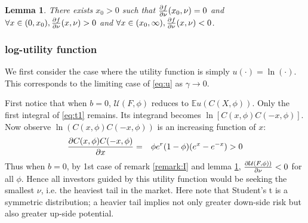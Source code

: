 \documentclass[11pt,a4]{amsart}
\newcommand{\pd}{\partial}
\newtheorem{lemma}{Lemma}[section]
\newcommand{\E }{{\mathbb E}}
\newcommand{\1}{{\mathbf 1}}
\begin{document}
\begin{lemma}
  \label{lemma:II}
  There exists $x_0 > 0$ such that ${\pd f \over \pd \nu}(x_0, \nu) = 0$ and
  $\forall x \in (0, x_0), {\pd f \over \pd \nu}(x, \nu) > 0$ and
  $\forall x \in (x_0, \infty), {\pd f \over \pd \nu}(x, \nu) < 0$.
\end{lemma}

\subsubsection{log-utility function}
We first consider the case where the utility function is simply
$u(\cdot) = \ln(\cdot)$. This corresponds to the limiting case of
\eqref{eq:u} as $\gamma \to 0$.

First notice that when $b = 0$, $\mathcal U(F, \phi)$ reduces to
$\E u(C(X, \phi))$. Only the first integral of \eqref{eq:t1} remains.
Its integrand becomes $\ln[C(x, \phi) C(-x, \phi)]$.
Now observe $\ln(C(x, \phi)C(-x, \phi))$ is an increasing function of
$x$:
\begin{eqnarray*}
  {\pd C(x, \phi) C(-x, \phi) \over \pd x}
  &=&
  \phi e^r (1 - \phi) (e^x - e^{-x}) > 0
\end{eqnarray*}
Thus when $b = 0$, by 1st case of remark \ref{remark:I} and lemma
\ref{lemma:II},
${\pd \mathcal U(F, \phi)) \over \pd \nu} < 0$ for all $\phi$. Hence all
investors guided by this utility function would be seeking the
smallest $\nu$, i.e. the heaviest tail in the market. Here note that
Student's t is a symmetric distribution; a heavier tail implies not
only greater down-side risk but also greater up-side potential.
\end{document}
